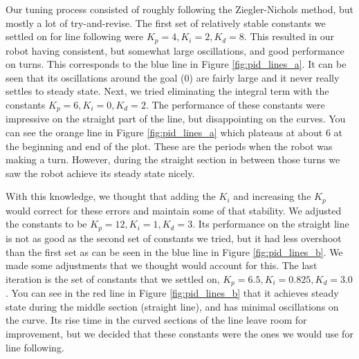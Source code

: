 \documentclass[12pt]{article}
\begin{document}
Our tuning process consisted of roughly following the Ziegler-Nichols method, but mostly a lot of try-and-revise. The first set of relatively stable constants we settled on for line following were $K_p=4,K_i=2,K_d=8$. This resulted in our robot having consistent, but somewhat large oscillations, and good performance on turns. This corresponds to the blue line in Figure \ref{fig:pid_lines_a}. It can be seen that its oscillations around the goal (0) are fairly large and it never really settles to steady state. Next, we tried eliminating the integral term with the constants $K_p=6,K_i=0,K_d=2$. The performance of these constants were impressive on the straight part of the line, but disappointing on the curves. You can see the orange line in Figure \ref{fig:pid_lines_a} which plateaus at about 6 at the beginning and end of the plot. These are the periods when the robot was making a turn. However, during the straight section in between those turns we saw the robot achieve its steady state nicely.

With this knowledge, we thought that adding the $K_i$ and increasing the $K_p$ would correct for these errors and maintain some of that stability. We adjusted the constants to be $K_p=12,K_i=1,K_d=3$. Its performance on the straight line is not as good as the second set of constants we tried, but it had less overshoot than the first set as can be seen in the blue line in Figure \ref{fig:pid_lines_b}. We made some adjustments that we thought would account for this. The last iteration is the set of constants that we settled on, $K_p=6.5,K_i=0.825,K_d=3.0$. You can see in the red line in Figure \ref{fig:pid_lines_b} that it achieves steady state during the middle section (straight line), and has minimal oscillations on the curve. Its rise time in the curved sections of the line leave room for improvement, but we decided that these constants were the ones we would use for line following.
\end{document}
